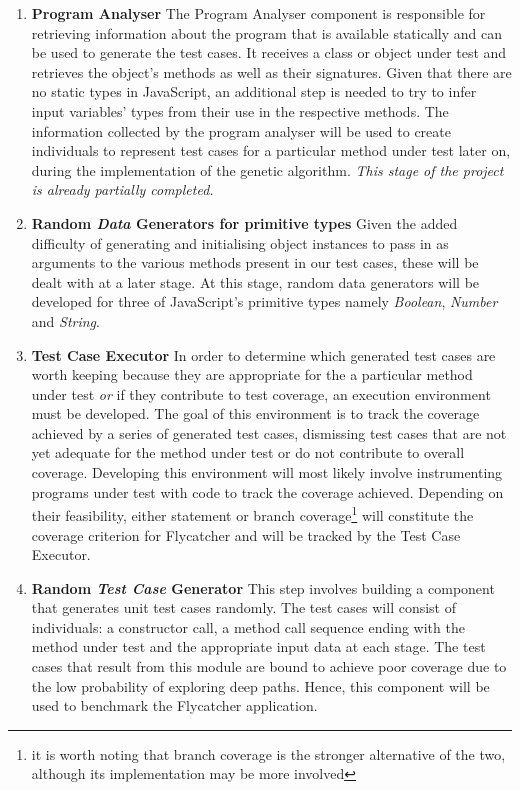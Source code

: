 \documentclass[a4paper,11pt,titlepage]{report}
\begin{document}
\begin{enumerate}
	
	\item{\textbf{Program Analyser}} The Program Analyser component is responsible for retrieving information about the program that is available statically and can be used to generate the test cases. It receives a class or object under test and retrieves the object's methods as well as their signatures. Given that there are no static types in JavaScript, an additional step is needed to try to infer input variables' types from their use in the respective methods. The information collected by the program analyser will be used to create individuals to represent test cases for a particular method under test later on, during the implementation of the genetic algorithm. \emph{This stage of the project is already partially completed.}
	 
	\item{\textbf{Random \emph{Data} Generators for primitive types}} Given the added difficulty of generating and initialising object instances to pass in as arguments to the various methods present in our test cases, these will be dealt with at a later stage. At this stage, random data generators will be developed for three of JavaScript's primitive types namely \emph{Boolean}, \emph{Number} and \emph{String}.

	\item{\textbf{Test Case Executor}} In order to determine which generated test cases are worth keeping because they are appropriate for the a particular method under test \emph{or} if they contribute to test coverage, an execution environment must be developed. The goal of this environment is to track the coverage achieved by a series of generated test cases, dismissing test cases that are not yet adequate for the method under test or do not contribute to overall coverage. Developing this environment will most likely involve instrumenting programs under test with code to track the coverage achieved. Depending on their feasibility, either statement or branch coverage\footnote{it is worth noting that branch coverage is the stronger alternative of the two, although its implementation may be more involved} will constitute the coverage criterion for Flycatcher and will be tracked by the Test Case Executor.

	\item{\textbf{Random \emph{Test Case} Generator}} This step involves building a component that generates unit test cases randomly. The test cases will consist of individuals: a constructor call, a method call sequence ending with the method under test and the appropriate input data at each stage. The test cases that result from this module are bound to achieve poor coverage due to the low probability of exploring deep paths. Hence, this component will be used to benchmark the Flycatcher application.
	

\end{enumerate}
\end{document}
